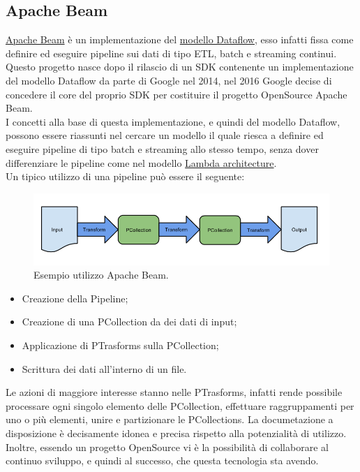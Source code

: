 \subsection{Apache Beam}
\href{http://www.vldb.org/pvldb/vol8/p1792-Akidau.pdf}{Apache Beam} è un implementazione del \href{https://ai.google/research/pubs/pub43864}{modello Dataflow}, esso infatti fissa come definire ed eseguire pipeline sui dati di tipo \gls{ETL}, batch e streaming continui. Questo progetto nasce dopo il rilascio di un \gls{SDK} contenente un implementazione del modello Dataflow da parte di Google nel 2014, nel 2016 Google decise di concedere il core del proprio SDK per costituire il progetto \gls{OpenSource} Apache Beam.
\\ I concetti alla base di questa implementazione, e quindi del modello Dataflow, possono essere riassunti nel cercare un modello il quale riesca a definire ed eseguire pipeline di tipo batch e streaming allo stesso tempo, senza dover differenziare le pipeline come nel modello \href{https://en.wikipedia.org/wiki/Lambda_architecture}{Lambda architecture}.
\\ Un tipico utilizzo di una pipeline può essere il seguente:
\begin{figure}[h!]
	\centering
	\includegraphics[scale=0.5]{figures/design-your-pipeline-linear}
	\caption[Esempio utilizzo Apache Beam. ]{Esempio utilizzo Apache Beam.
		\label{fig:logoGCP}}
\end{figure}	
\begin{itemize}
	\item Creazione della Pipeline;
	\item Creazione di una PCollection da dei dati di input;
	\item Applicazione di PTrasforms sulla PCollection;
	\item Scrittura dei dati all'interno di un file.
\end{itemize}
Le azioni di maggiore interesse stanno nelle PTrasforms, infatti rende possibile processare ogni singolo elemento delle PCollection, effettuare raggruppamenti per uno o più elementi, unire  e partizionare le PCollections.
La documetazione a disposizione è decisamente idonea e precisa rispetto alla potenzialità di utilizzo. Inoltre, essendo un progetto OpenSource vi è la possibilità di collaborare al continuo sviluppo, e quindi al successo, che questa tecnologia sta avendo.
